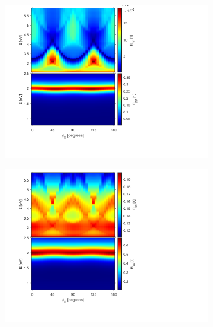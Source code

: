 \begin{figure}
    \begin{subfigure}{0.5\textwidth}
        \centering
        \includegraphics[width=\linewidth, trim=1.1cm 1.8cm 6.7cm 0.3cm, clip]{figures/ch4/S5A/contour/S5A_Rpp.png}
        \caption{}
        \label{fig:S5A_contour_Rpp}
    \end{subfigure}
    \begin{subfigure}{0.5\textwidth}
        \centering
        \includegraphics[width=\linewidth, trim=1.1cm 1.8cm 6.7cm 0.3cm, clip]{figures/ch4/S5A/contour/S5A_Rss.png}
        \caption{}
        \label{fig:S5A_contour_Rss}
    \end{subfigure}
    

\end{figure}
